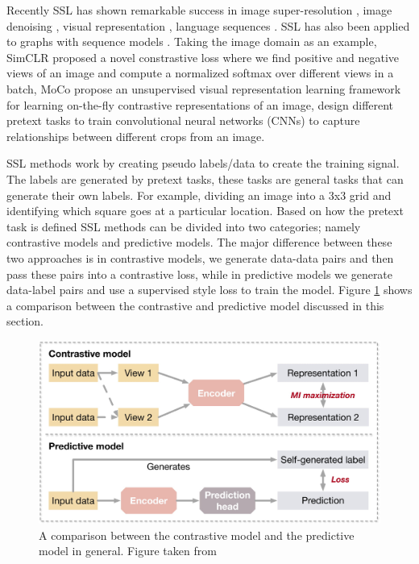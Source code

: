 \documentclass{article}
\begin{document}
Recently SSL has shown remarkable success in image super-resolution \citep{example1}, image denoising \citep{example2, example3}, visual representation \citep{example4, example5, example6}, language sequences \citep{example7, example8}. SSL has also been applied to graphs with sequence models \citep{example9, example10}. Taking the image domain as an example, SimCLR \citep{example11} proposed a novel constrastive loss where we find positive and negative views of an image and compute a normalized softmax over different views in a batch, MoCo \citep{example12} propose an unsupervised visual representation learning framework for learning on-the-fly contrastive representations of an image, \citep{example13, example14} design different pretext tasks to train convolutional neural networks (CNNs) to capture relationships between different crops from an image.

SSL methods work by creating pseudo labels/data to create the training signal. The labels are generated by pretext tasks, these tasks are general tasks that can generate their own labels. For example, dividing an image into a 3x3 grid and identifying which square goes at a particular location. Based on how the pretext task is defined SSL methods can be divided into two categories; namely contrastive models and predictive models. The major difference between these two approaches is in contrastive models, we generate data-data pairs and then pass these pairs into a contrastive loss, while in predictive models we generate data-label pairs and use a supervised style loss to train the model. Figure \ref{fig:fig1} shows a comparison between the contrastive and predictive model discussed in this section.

\begin{figure}
	\centering
	\includegraphics[scale=0.2]{figure1.jpg}
	\caption{A comparison between the contrastive model and the predictive model in general. Figure taken from \citep{cite1}}
	\label{fig:fig1}
\end{figure}
\end{document}
